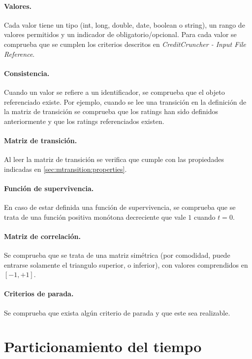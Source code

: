 \paragraph{Valores.} Cada valor tiene un tipo (int, long, double,
date, boolean o string), un rango de valores permitidos y un
indicador de obligatorio/opcional. Para cada valor se comprueba
que se cumplen los criterios descritos en
\emph{CreditCruncher - Input File Reference}.

\paragraph{Consistencia.} Cuando un valor se refiere a un identificador,
se comprueba que el objeto referenciado existe. Por ejemplo, cuando se
lee una transici\'on en la definici\'on de la matriz de transici\'on se
comprueba que los ratings han sido definidos anteriormente y que los
ratings referenciados existen.

\paragraph{Matriz de transici\'on.} Al leer la matriz de transici\'on
se verifica que cumple con las propiedades indicadas en
\ref{sec:mtransition:properties}.

\paragraph{Funci\'on de supervivencia.} En caso de estar definida
una funci\'on de supervivencia, se comprueba que se trata de una
funci\'on positiva mon\'otona decreciente que vale $1$ cuando $t=0$.

\paragraph{Matriz de correlaci\'on.} Se comprueba que se trata de
una matriz sim\'etrica (por comodidad, puede entrarse solamente
el triangulo superior, o inferior), con valores comprendidos
en $[-1,+1]$.

\paragraph{Criterios de parada.} Se comprueba que exista alg\'un
criterio de parada y que este sea realizable.


\section{Particionamiento del tiempo}

